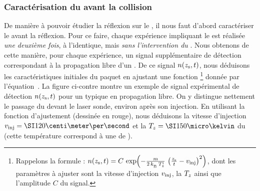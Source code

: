 {\AjouteLigne}

\subsubsection{Caractérisation du \pat avant la collision}
\label{sec:CaracPatLibre}
De manière à pouvoir étudier la réflexion sur le \mimo, il nous faut d'abord caractériser le \pat avant la réflexion. 
Pour ce faire, chaque expérience impliquant le \mimo est réalisée \emph{une deuxième fois}, à l'identique, mais \emph{sans l'intervention du \mimo}. Nous obtenons de cette manière, pour chaque expérience, un signal supplémentaire de détection correspondant à la propagation libre d'un \pat. 
%
%
%
De ce signal $n({z_{\rm s}},t)$, nous déduisons les caractéristiques initiales du paquet en ajustant une fonction%
\footnote{Rappelons la formule :
$
n({z_{\rm s}},t) = C\,\exp \hspace{-2pt} \left(-\tfrac{m}{2\,{k_{_{\rm B}}}\,T_{z}^{\rm i}}
	\,\left( \tfrac{{z_{\rm s}}}{t}-v_{{\rm {inj}}}\right)^2\right)
$, dont les paramètres à ajuster sont la vitesse d'injection $v_{{\rm {inj}}}$, la \templong $T_{z}$ ainsi que l'amplitude $C$ du signal.}
 donnée par l'équation~. 
La figure ci-contre montre un exemple de signal expérimental de détection $n({z_{\rm s}},t)$ pour un \pat typique en propagation libre. On y distingue nettement le passage du \pat devant le laser sonde, environ  après son injection. 
\noindent
En utilisant la fonction d'ajustement (dessinée en rouge), nous déduisons la vitesse d'injection $\vinj = \cmps{120}$ et la \templong $\Tlong = \microK{150}$ du \pat (cette température correspond à une \dispvitlong de ).
{}

